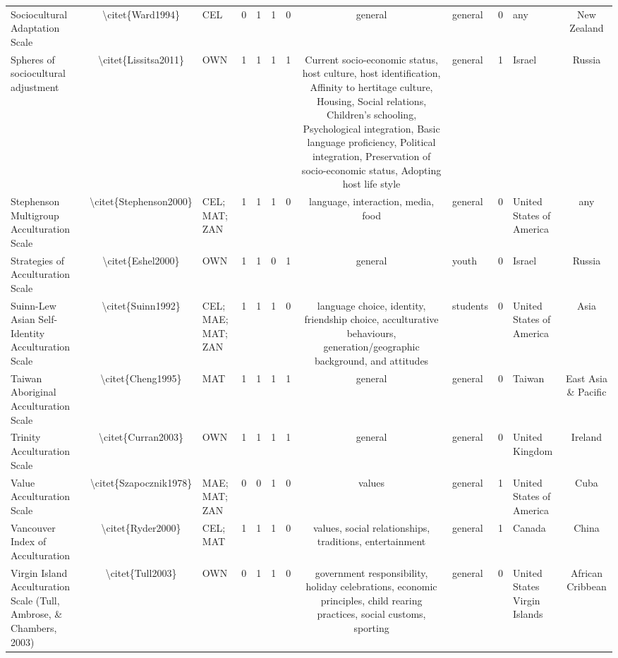 \begin{longtable}[l]{lclclclclclc}
Sociocultural Adaptation Scale & \textbackslash{}citet\{Ward1994\} & CEL & 0 & 1 & 1 & 0 & general & general & 0 & any & New Zealand\\
Spheres of sociocultural adjustment & \textbackslash{}citet\{Lissitsa2011\} & OWN & 1 & 1 & 1 & 1 & Current socio-economic status, host culture, host identification, Affinity to hertitage culture, Housing, Social relations, Children’s schooling, Psychological integration, Basic language proficiency, Political integration, Preservation of socio-economic status, Adopting host life style & general & 1 & Israel & Russia\\
Stephenson Multigroup Acculturation Scale & \textbackslash{}citet\{Stephenson2000\} & CEL; MAT; ZAN & 1 & 1 & 1 & 0 & language, interaction, media, food & general & 0 & United States of America & any\\
Strategies of Acculturation Scale & \textbackslash{}citet\{Eshel2000\} & OWN & 1 & 1 & 0 & 1 & general & youth & 0 & Israel & Russia\\
Suinn-Lew Asian Self-Identity Acculturation Scale & \textbackslash{}citet\{Suinn1992\} & CEL; MAE; MAT; ZAN & 1 & 1 & 1 & 0 & language choice, identity, friendship choice, acculturative behaviours, generation/geographic background, and attitudes & students & 0 & United States of America & Asia\\
Taiwan Aboriginal Acculturation Scale & \textbackslash{}citet\{Cheng1995\} & MAT & 1 & 1 & 1 & 1 & general & general & 0 & Taiwan & East Asia \& Pacific\\
Trinity Acculturation Scale & \textbackslash{}citet\{Curran2003\} & OWN & 1 & 1 & 1 & 1 & general & general & 0 & United Kingdom & Ireland\\
Value Acculturation Scale & \textbackslash{}citet\{Szapocznik1978\} & MAE; MAT; ZAN & 0 & 0 & 1 & 0 & values & general & 1 & United States of America & Cuba\\
Vancouver Index of Acculturation & \textbackslash{}citet\{Ryder2000\} & CEL; MAT & 1 & 1 & 1 & 0 & values, social relationships, traditions, entertainment & general & 1 & Canada & China\\
Virgin Island Acculturation Scale (Tull, Ambrose, \& Chambers, 2003) & \textbackslash{}citet\{Tull2003\} & OWN & 0 & 1 & 1 & 0 & government responsibility, holiday celebrations, economic principles, child rearing practices, social customs, sporting & general & 0 & United States Virgin Islands & African Cribbean\\*
\end{longtable}

